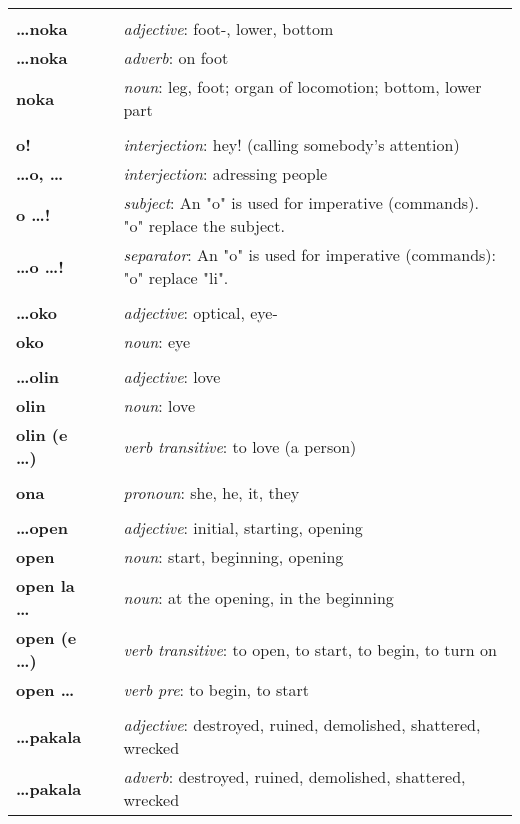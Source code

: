 \begin{supertabular}{p{2,5cm}|ll}
 && \\ %
\textbf{\dots noka} && \textit{adjective}: foot-, lower, bottom \\  
\textbf{ \dots noka } && \textit{adverb}: on foot \\  
\textbf{noka} && \textit{noun}: leg, foot; organ of locomotion; bottom, lower part \\ 
 && \\ %
\textbf{o!} && \textit{interjection}: hey! (calling somebody's attention) \\ 
\textbf{\dots o, \dots} && \textit{interjection}: adressing people \\ 
\textbf{o \dots !} && \textit{subject}: An "o" is used for imperative (commands). "o" replace the subject.  \\ 
\textbf{\dots o \dots !} && \textit{separator}: An "o" is used for imperative (commands): "o" replace "li". \\ 
 && \\ %
\textbf{\dots oko} && \textit{adjective}: optical, eye- \\ 
\textbf{oko} && \textit{noun}: eye \\ 
 && \\ %
\textbf{\dots olin} && \textit{adjective}: love \\ 
\textbf{olin} && \textit{noun}: love \\ 
\textbf{olin (e \dots)} && \textit{verb transitive}: to love (a person) \\ 
 && \\ %
\textbf{ona} && \textit{pronoun}: she, he, it, they \\ 
 && \\ %
\textbf{\dots open} && \textit{adjective}: initial, starting, opening \\ 
\textbf{open} && \textit{noun}: start, beginning, opening \\ 
\textbf{open la \dots} && \textit{noun}: at the opening, in the beginning  \\ 
\textbf{open (e \dots)} && \textit{verb transitive}: to open, to start, to begin, to turn on \\ 
\textbf{open \dots } && \textit{verb pre}: to begin, to start \\ 
 && \\ %
\textbf{\dots pakala} && \textit{adjective}: destroyed, ruined, demolished, shattered, wrecked \\ 
\textbf{\dots pakala} && \textit{adverb}: destroyed, ruined, demolished, shattered, wrecked \\ 

\end{supertabular}
